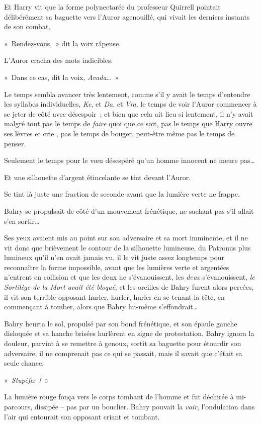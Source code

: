 Et Harry vit que la forme polynectarée du professeur Quirrell pointait délibérément sa baguette vers l'Auror agenouillé, qui vivait les derniers instants de son combat.

«~Rendez-vous,~» dit la voix râpeuse.

L'Auror cracha des mots indicibles.

«~Dans ce cas, dit la voix, \emph{Avada…}~»

Le temps sembla avancer très lentement, comme s'il y avait le temps d'entendre les syllabes individuelles, \emph{Ke}, et \emph{Da}, et \emph{Vra}, le temps de voir l'Auror commencer à se jeter de côté avec désespoir~; et bien que cela ait lieu si lentement, il n'y avait malgré tout pas le temps de \emph{faire} quoi que ce soit, pas le temps que Harry ouvre ses lèvres et crie , pas le temps de bouger, peut-être même pas le temps de penser.

Seulement le temps pour le vœu désespéré qu'un homme innocent ne meure pas…

Et une silhouette d'argent étincelante se tint devant l'Auror.

Se tint là juste une fraction de seconde avant que la lumière verte ne frappe.

\later

Bahry se propulsait de côté d'un mouvement frénétique, ne sachant pas s'il allait s'en sortir…

Ses yeux avaient mis au point sur son adversaire et sa mort imminente, et il ne vit donc que brièvement le contour de la silhouette lumineuse, du Patronus plus lumineux qu'il n'en avait jamais vu, il le vit juste assez longtemps pour reconnaître la forme impossible, avant que les lumières verte et argentées n'entrent en collision et que les deux ne s'évanouissent, les \emph{deux} s'évanouissent, \emph{le Sortilège de la Mort avait été bloqué}, et les oreilles de Bahry furent alors percées, il vit son terrible opposant hurler, hurler, hurler en se tenant la tête, en commençant à tomber, alors que Bahry lui-même s'effondrait…

Bahry heurta le sol, propulsé par son bond frénétique, et son épaule gauche disloquée et sa hanche brisées hurlèrent en signe de protestation. Bahry ignora la douleur, parvint à se remettre à genoux, sortit sa baguette pour étourdir son adversaire, il ne comprenait pas ce qui se passait, mais il savait que c'était sa seule chance.

«~\emph{Stupéfix~!}~»

La lumière rouge fonça vers le corps tombant de l'homme et fut déchirée à mi-parcours, dissipée -- pas par un bouclier. Bahry pouvait la \emph{voir}, l'ondulation dans l'air qui entourait son opposant criant et tombant.

